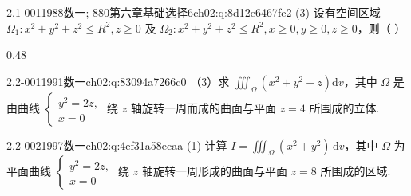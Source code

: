 \par\addvspace{2.4ex}\noindent
\begin{minipage}{\linewidth}

\begin{q}{2.1-001}{1988数一; 880第六章基础选择6}{ch02:q:8d12e6467fe2}
(3) 设有空间区域 $\Omega_1: x^2+y^2+z^2 \le R^2, z \ge 0$ 及 $\Omega_2: x^2+y^2+z^2 \le R^2, x \ge 0, y \ge 0, z \ge 0$，则（ ）
\begin{opts}{0.48}
\hfill{}\\[0.3ex]
\hfill{}
\end{opts}
\end{q}
\end{minipage}


\par\addvspace{2.4ex}\noindent
\begin{minipage}{\linewidth}

\begin{q}{2.2-001}{1991数一}{ch02:q:83094a7266c0}
（3）求 $\displaystyle \iiint_{\Omega}(x^2+y^2+z)\mathrm{d}v$，其中 $\Omega$ 是由曲线 $\begin{cases} y^2=2z,\\ x=0 \end{cases}$ 绕 $z$ 轴旋转一周而成的曲面与平面 $z=4$ 所围成的立体.
\end{q}
\end{minipage}


\begin{q}{2.2-002}{1997数一}{ch02:q:4ef31a58ecaa}
(1) 计算 $\displaystyle I=\iiint_{\Omega}(x^2+y^2)\,\mathrm{d}v$，其中 $\Omega$ 为平面曲线 $\begin{cases} y^2=2z,\\ x=0 \end{cases}$ 绕 $z$ 轴旋转一周形成的曲面与平面 $z=8$ 所围成的区域.
\end{q}

